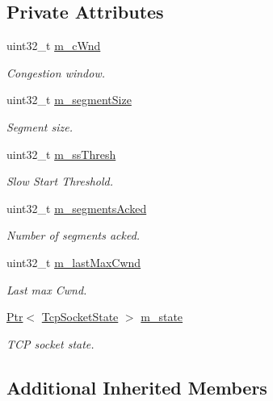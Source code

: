 \subsection*{Private Attributes}
\begin{DoxyCompactItemize}
\item 
uint32\+\_\+t \hyperlink{classTcpBicIncrementTest_ad466007e997817bd877b4c08346a5125}{m\+\_\+c\+Wnd}
\begin{DoxyCompactList}\small\item\em Congestion window. \end{DoxyCompactList}\item 
uint32\+\_\+t \hyperlink{classTcpBicIncrementTest_ade93140ecf0019b8c17b6ddbd3361167}{m\+\_\+segment\+Size}
\begin{DoxyCompactList}\small\item\em Segment size. \end{DoxyCompactList}\item 
uint32\+\_\+t \hyperlink{classTcpBicIncrementTest_a9c70339d86bc09924c92a65c2d2fcc00}{m\+\_\+ss\+Thresh}
\begin{DoxyCompactList}\small\item\em Slow Start Threshold. \end{DoxyCompactList}\item 
uint32\+\_\+t \hyperlink{classTcpBicIncrementTest_ad246654ee463b2af9db44089f4d2f1c9}{m\+\_\+segments\+Acked}
\begin{DoxyCompactList}\small\item\em Number of segments acked. \end{DoxyCompactList}\item 
uint32\+\_\+t \hyperlink{classTcpBicIncrementTest_abc6cf3f641221e276bd5eb67975b1037}{m\+\_\+last\+Max\+Cwnd}
\begin{DoxyCompactList}\small\item\em Last max Cwnd. \end{DoxyCompactList}\item 
\hyperlink{classns3_1_1Ptr}{Ptr}$<$ \hyperlink{classns3_1_1TcpSocketState}{Tcp\+Socket\+State} $>$ \hyperlink{classTcpBicIncrementTest_ad536c9ce669c8e9a264f8ac4c8937f7f}{m\+\_\+state}
\begin{DoxyCompactList}\small\item\em T\+CP socket state. \end{DoxyCompactList}\end{DoxyCompactItemize}
\subsection*{Additional Inherited Members}


